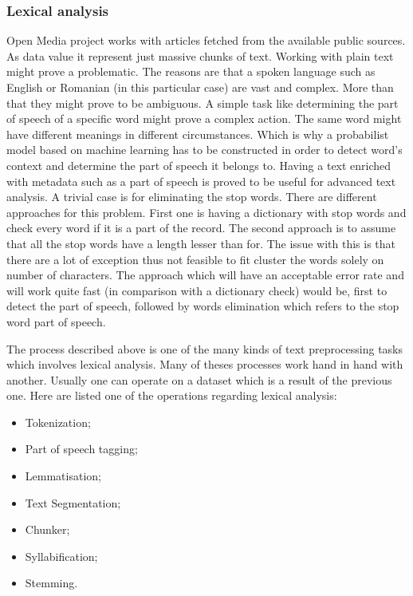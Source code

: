 

\subsubsection{Lexical analysis}
Open Media project works with articles fetched from the available public sources. As data value it represent just massive chunks of text. Working with plain text might prove a problematic. The reasons are that a spoken language such as English or Romanian (in this particular case) are vast and complex. More than that they might prove to be ambiguous. A simple task like determining the part of speech of a specific word might prove a complex action. The same word might have different meanings in different circumstances. Which is why a probabilist model based on machine learning has to be constructed in order to detect word's context and determine the part of speech it belongs to. Having a text enriched with metadata such as a part of speech is proved to be useful for advanced text analysis. A trivial case is for eliminating the stop words. There are different approaches for this problem. First one is having a dictionary with stop words and check every word if it is a part of the record. The second approach is to assume that all the stop words have a length lesser than for. The issue with this is that there are a lot of exception thus not feasible to fit cluster the words solely on number of characters. The approach which will have an acceptable error rate and will work quite fast (in comparison with a dictionary check) would be, first to detect the part of speech, followed by words elimination which refers to the stop word part of speech.

The process described above is one of the many kinds of text preprocessing tasks which involves lexical analysis. Many of theses processes work hand in hand with another. Usually one can operate on a dataset which is a result of the previous one. Here are listed one of the operations regarding lexical analysis:
\begin{itemize}
    \item Tokenization;
    \item Part of speech tagging;
    \item Lemmatisation;
    \item Text Segmentation;
    \item Chunker;
    \item Syllabification;
    \item Stemming.
\end{itemize}

